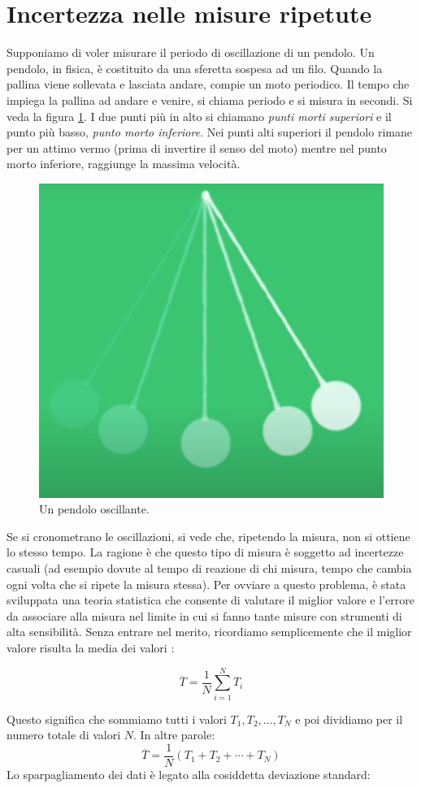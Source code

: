 \section{Incertezza nelle misure ripetute }
Supponiamo di voler misurare il periodo di oscillazione di un pendolo. Un pendolo, in fisica, è costituito da una sferetta sospesa ad un filo. Quando la pallina viene sollevata e lasciata andare, compie un moto periodico. Il tempo che impiega la pallina ad andare e venire, si chiama periodo e si misura in secondi. Si veda la figura \ref{fig:pendolo}. I due punti più in alto si chiamano \textit{punti morti superiori} e il punto più basso, \textit{punto morto inferiore}. Nei punti alti superiori il pendolo rimane per un attimo vermo (prima di invertire il senso del moto) mentre nel punto morto inferiore, raggiunge la massima velocità.

   \begin{figure}[h!]
    \centering
    \includegraphics[width=0.3\linewidth]{path_to_image/pendolo.png} 
    \caption{Un pendolo oscillante.}
    \label{fig:pendolo}
\end{figure}  


Se si cronometrano le oscillazioni, si vede che, ripetendo la misura, non si ottiene lo stesso tempo. La ragione è che questo tipo di misura è soggetto ad incertezze casuali (ad esempio dovute al tempo di reazione di chi misura, tempo che cambia ogni volta che si ripete la misura stessa). Per ovviare a questo problema, è stata sviluppata una teoria statistica che consente di valutare il miglior valore e l'errore da associare alla misura nel limite in cui si fanno tante misure con strumenti di alta sensibilità. Senza entrare nel merito, ricordiamo semplicemente che il miglior valore risulta la media dei valori :

\[
\overline{T} = \frac{1}{N} \sum_{i=1}^{N} T_i
\]

\noindent
Questo significa che sommiamo tutti i valori $T_1, T_2, \ldots, T_N$ e poi dividiamo per il numero totale di valori $N$. In altre parole:
\[
\overline{T} = \frac{1}{N} (T_1 + T_2 + \cdots + T_N)
\]
Lo sparpagliamento dei dati  è legato alla cosiddetta deviazione standard:

